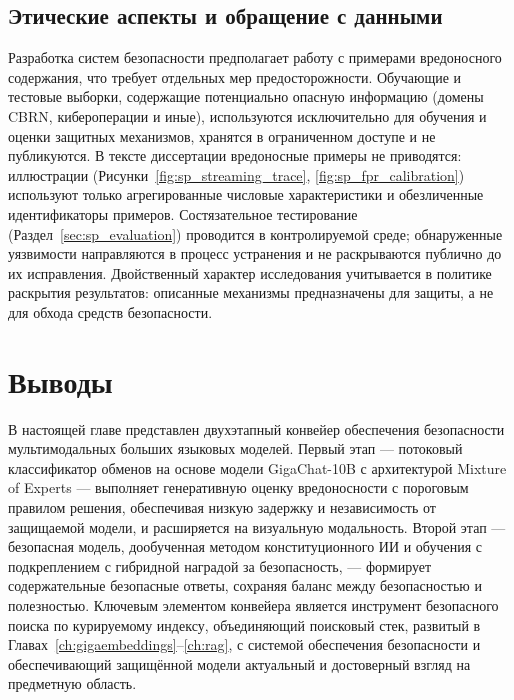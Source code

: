 \subsection{Этические аспекты и обращение с данными}\label{subsec:sp_ethics}

Разработка систем безопасности предполагает работу с примерами вредоносного содержания, что требует отдельных мер предосторожности.
Обучающие и тестовые выборки, содержащие потенциально опасную информацию (домены CBRN, кибероперации и иные), используются исключительно для обучения и оценки защитных механизмов, хранятся в ограниченном доступе и не публикуются.
В тексте диссертации вредоносные примеры не приводятся: иллюстрации (Рисунки~\ref{fig:sp_streaming_trace}, \ref{fig:sp_fpr_calibration}) используют только агрегированные числовые характеристики и обезличенные идентификаторы примеров.
Состязательное тестирование (Раздел~\ref{sec:sp_evaluation}) проводится в контролируемой среде; обнаруженные уязвимости направляются в процесс устранения и не раскрываются публично до их исправления.
Двойственный характер исследования учитывается в политике раскрытия результатов: описанные механизмы предназначены для защиты, а не для обхода средств безопасности.

\section{Выводы}\label{sec:sp_conclusions}

В настоящей главе представлен двухэтапный конвейер обеспечения безопасности мультимодальных больших языковых моделей.
Первый этап --- потоковый классификатор обменов на основе модели GigaChat-10B с архитектурой Mixture of Experts --- выполняет генеративную оценку вредоносности с пороговым правилом решения, обеспечивая низкую задержку и независимость от защищаемой модели, и расширяется на визуальную модальность.
Второй этап --- безопасная модель, дообученная методом конституционного ИИ и обучения с подкреплением с гибридной наградой за безопасность, --- формирует содержательные безопасные ответы, сохраняя баланс между безопасностью и полезностью.
Ключевым элементом конвейера является инструмент безопасного поиска по курируемому индексу, объединяющий поисковый стек, развитый в Главах~\ref{ch:gigaembeddings}--\ref{ch:rag}, с системой обеспечения безопасности и обеспечивающий защищённой модели актуальный и достоверный взгляд на предметную область.
